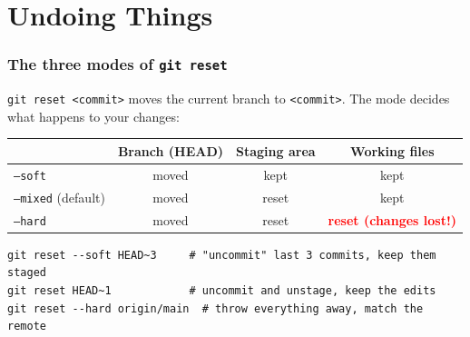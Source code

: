 \documentclass[aspectratio=169,10pt,compress]{beamer}
\newcommand{\cmd}[1]{\texttt{\color{gitred}#1}}
\begin{document}
\section[Undo]{Undoing Things}

\begin{frame}[t,fragile] \frametitle{The three modes of \texttt{git reset}}
  \cmd{git reset <commit>} moves the current branch to \texttt{<commit>}.
  The mode decides what happens to your changes:

  \vspace{0.5em}
  \small
  \begin{tabular}{@{}lccc@{}}
    \toprule
    & \textbf{Branch (HEAD)} & \textbf{Staging area} & \textbf{Working files} \\
    \midrule
    \cmd{--soft}  & moved & kept & kept \\
    \cmd{--mixed} (default) & moved & reset & kept \\
    \cmd{--hard}  & moved & reset & \textcolor{red}{\textbf{reset (changes lost!)}} \\
    \bottomrule
  \end{tabular}

  \vspace{0.5em}
\begin{lstlisting}
git reset --soft HEAD~3     # "uncommit" last 3 commits, keep them staged
git reset HEAD~1            # uncommit and unstage, keep the edits
git reset --hard origin/main  # throw everything away, match the remote
\end{lstlisting}
\end{frame}
\end{document}

